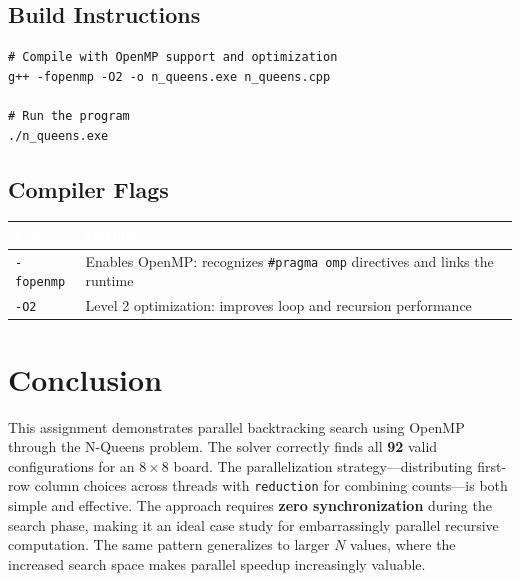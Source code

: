 \documentclass[11pt]{article}
\begin{document}
\subsection{Build Instructions}

\begin{codebox}
\begin{lstlisting}[style=bashstyle]
# Compile with OpenMP support and optimization
g++ -fopenmp -O2 -o n_queens.exe n_queens.cpp

# Run the program
./n_queens.exe
\end{lstlisting}
\end{codebox}

\subsection{Compiler Flags}

\begin{center}
\sffamily\small
\begin{tabular}{@{}lp{10cm}@{}}
\toprule
\rowcolor{tableheader}
\textcolor{white}{\textbf{Flag}} & \textcolor{white}{\textbf{Purpose}} \\
\midrule
\rowcolor{rowalt}
\texttt{-fopenmp} & Enables OpenMP: recognizes \texttt{\#pragma omp} directives and links the runtime \\
\texttt{-O2} & Level 2 optimization: improves loop and recursion performance \\
\bottomrule
\end{tabular}
\end{center}

\section{Conclusion}

This assignment demonstrates parallel backtracking search using OpenMP through the N-Queens problem. The solver correctly finds all \textbf{92} valid configurations for an $8 \times 8$ board. The parallelization strategy---distributing first-row column choices across threads with \texttt{reduction} for combining counts---is both simple and effective. The approach requires \textbf{zero synchronization} during the search phase, making it an ideal case study for embarrassingly parallel recursive computation. The same pattern generalizes to larger $N$ values, where the increased search space makes parallel speedup increasingly valuable.
\end{document}
